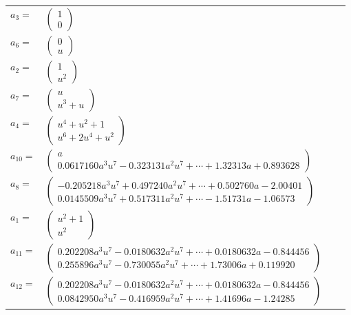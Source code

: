 \documentclass[1p]{elsarticle_modified}
\theoremstyle{definition}
\begin{document}
\begin{tabular}{m{7pt} m{180pt} m{7pt} m{180pt} }
\flushright $a_{3}=$&$\begin{pmatrix}1\\0\end{pmatrix}$ \\
\flushright $a_{6}=$&$\begin{pmatrix}0\\u\end{pmatrix}$ \\
\flushright $a_{2}=$&$\begin{pmatrix}1\\u^2\end{pmatrix}$ \\
\flushright $a_{7}=$&$\begin{pmatrix}u\\u^3+u\end{pmatrix}$ \\
\flushright $a_{4}=$&$\begin{pmatrix}u^4+u^2+1\\u^6+2 u^4+u^2\end{pmatrix}$ \\
\flushright $a_{10}=$&$\begin{pmatrix}a\\0.0617160 a^{3} u^{7}-0.323131 a^{2} u^{7}+\cdots+1.32313 a+0.893628\end{pmatrix}$ \\
\flushright $a_{8}=$&$\begin{pmatrix}-0.205218 a^{3} u^{7}+0.497240 a^{2} u^{7}+\cdots+0.502760 a-2.00401\\0.0145509 a^{3} u^{7}+0.517311 a^{2} u^{7}+\cdots-1.51731 a-1.06573\end{pmatrix}$ \\
\flushright $a_{1}=$&$\begin{pmatrix}u^2+1\\u^2\end{pmatrix}$ \\
\flushright $a_{11}=$&$\begin{pmatrix}0.202208 a^{3} u^{7}-0.0180632 a^{2} u^{7}+\cdots+0.0180632 a-0.844456\\0.255896 a^{3} u^{7}-0.730055 a^{2} u^{7}+\cdots+1.73006 a+0.119920\end{pmatrix}$ \\
\flushright $a_{12}=$&$\begin{pmatrix}0.202208 a^{3} u^{7}-0.0180632 a^{2} u^{7}+\cdots+0.0180632 a-0.844456\\0.0842950 a^{3} u^{7}-0.416959 a^{2} u^{7}+\cdots+1.41696 a-1.24285\end{pmatrix}$ \\

\end{tabular}
\end{document}
